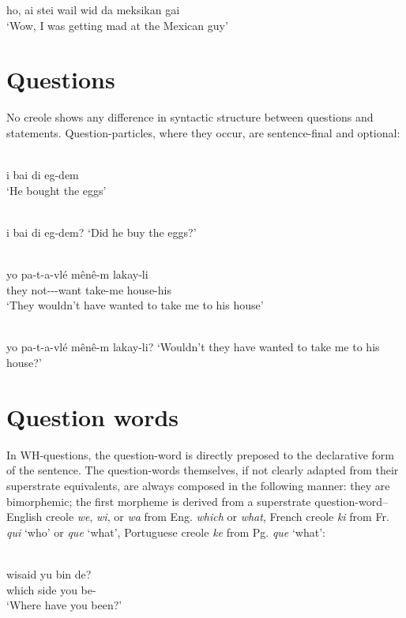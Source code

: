 \ea\label{ex:2:74}
 ho, ai stei wail wid da meksikan gai\\
\glt `Wow, I was getting mad at the Mexican guy'
\z


\section{Questions}
No creole shows any difference in syntactic structure between questions and statements. Question-particles, where they occur, are sentence-final and optional:

\ea\label{ex:2:75}
 \\
 i bai di eg-dem\\
\glt `He bought the eggs'
\z

\ea\label{ex:2:76}
\\
i bai di eg-dem?
\glt `Did he buy the eggs?'
\z

\ea\label{ex:2:77}
\\
\gll yo pa-t-a-vlé m{\^e}n{\^e}-m lakay-li\\
they not-\TNS-\MOD-want take-me house-his\\
\glt `They wouldn't have wanted to take me to his house'
\z

\ea\label{ex:2:78}
\\
yo pa-t-a-vlé m{\^e}n{\^e}-m lakay-li?
\glt `Wouldn't they have wanted to take me to his house?'
\z
\section{Question words}

In WH-questions, the question-word is directly preposed to the declarative form of the sentence. The question-words themselves, if not clearly adapted from their superstrate equivalents, are always composed in the following manner: they are bimorphemic; the first morpheme is derived from a superstrate question-word--English creole \textit{we}, \textit{wi}, or \textit{wa} from Eng. \textit{which} or \textit{what}, French creole \textit{ki} from Fr. \textit{qui} `who' or \textit{que} `what', Portuguese creole \textit{ke} from Pg. \textit{que} `what':

\ea\label{ex:2:79}
\\
 \gll wisaid yu bin de?\\
{which side} you {\TNS} be-\LOC \\
\glt `Where have you been?'
\z

